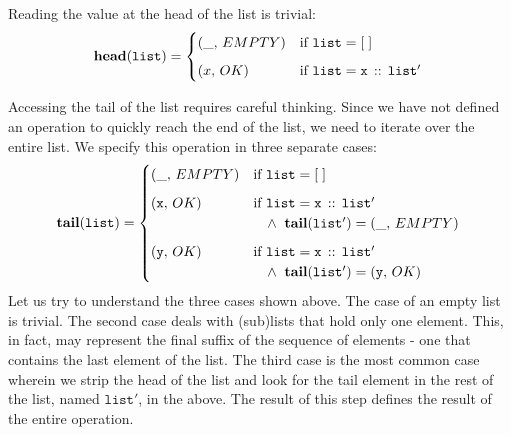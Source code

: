 \documentclass[10pt]{article}
\begin{document}
  \noindent Reading the value at the head of the list is trivial:
    \[
        \mathtt{\mathbf{head}(list)} = \begin{cases}
            (\_, \,EMPTY) & \mbox{if } \mathtt{list} = [\;]\vspace*{6pt}\\
            (x, \,OK) & \mbox{if } \mathtt{list = x \, ::\, list'}\\
        \end{cases}\vspace*{6pt}\\
    \]

  \noindent Accessing the tail of the list requires careful thinking. Since we have not defined an operation to quickly reach the end of the list, we need to iterate over the entire list. We specify this operation in three separate cases:
    \[
        \mathtt{\mathbf{tail}(list)} = \begin{cases}
            (\_, \,EMPTY) & \mbox{if } \mathtt{list} = [\;]\vspace*{6pt}\\
            (\mathtt{x}, \,OK) & \mbox{if } \mathtt{list = x \, ::\, list'} \\
                                    & \hspace*{10pt}\wedge\;\; \mathtt{\mathbf{tail}(list')} = (\_, \, EMPTY)\vspace*{6pt}\\
            (\mathtt{y}, \,OK) & \mbox{if } \mathtt{list = x \, ::\, list'} \\
                                    & \hspace*{10pt}\wedge\;\; \mathtt{\mathbf{tail}(list')} = (\mathtt{y}, \, OK)\\
        \end{cases}\vspace*{2pt}\\
    \]
  \noindent Let us try to understand the three cases shown above. The case of an empty list is trivial. The second case deals with (sub)lists that hold only one element. This, in fact, may represent the final suffix of the sequence of elements - one that contains the last element of the list. The third case is the most common case wherein we strip the head of the list and look for the tail element in the rest of the list, named $\mathtt{list'}$, in the above. The result of this step defines the result of the entire operation.
\end{document}
